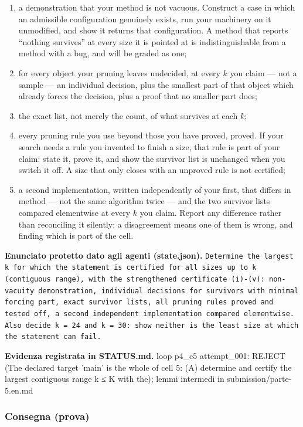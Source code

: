 \documentclass[11pt,a4paper]{article}
\begin{document}
\begin{enumerate}
\def\labelenumi{(\roman{enumi})}
\item
  a demonstration that your method is not vacuous. Construct a case in
  which an admissible configuration genuinely exists, run your machinery
  on it unmodified, and show it returns that configuration. A method
  that reports ``nothing survives'' at every size it is pointed at is
  indistinguishable from a method with a bug, and will be graded as one;
\item
  for every object your pruning leaves undecided, at every \(k\) you
  claim --- not a sample --- an individual decision, plus the smallest
  part of that object which already forces the decision, plus a proof
  that no smaller part does;
\item
  the exact list, not merely the count, of what survives at each \(k\);
\item
  every pruning rule you use beyond those you have proved, proved. If
  your search needs a rule you invented to finish a size, that rule is
  part of your claim: state it, prove it, and show the survivor list is
  unchanged when you switch it off. A size that only closes with an
  unproved rule is not certified;
\item
  a second implementation, written independently of your first, that
  differs in method --- not the same algorithm twice --- and the two
  survivor lists compared elementwise at every \(k\) you claim. Report
  any difference rather than reconciling it silently: a disagreement
  means one of them is wrong, and finding which is part of the cell.
\end{enumerate}

\textbf{Enunciato protetto dato agli agenti (state.json).} \texttt{Determine the largest k for which the statement is certified for all sizes up to k (contiguous range), with the strengthened certificate (i)-(v): non-vacuity demonstration, individual decisions for survivors with minimal forcing part, exact survivor lists, all pruning rules proved and tested off, a second independent implementation compared elementwise. Also decide k = 24 and k = 30: show neither is the least size at which the statement can fail.}

\textbf{Evidenza registrata in STATUS.md.} loop p4\_c5 attempt\_001: REJECT (The declared target 'main' is the whole of cell 5: (A) determine and certify the largest contiguous range k ≤ K with the); lemmi intermedi in submission/parte-5.en.md

\subsubsection{Consegna (prova)}
\end{document}
